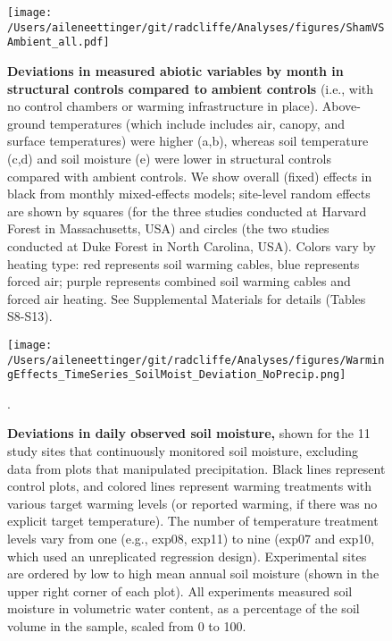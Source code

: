 \documentclass{article}
\begin{document}
 \begin{figure}[p]
\centering
\texttt{[image: /Users/aileneettinger/git/radcliffe/Analyses/figures/ShamVSAmbient\_all.pdf]} 
 \caption{\textbf{Deviations in measured abiotic variables by month in structural controls compared to ambient controls} (i.e., with no control chambers or warming infrastructure in place). Above-ground temperatures (which include includes air, canopy, and surface temperatures) were higher (a,b), whereas soil temperature (c,d) and soil moisture (e) were lower in structural controls compared with ambient controls. We show overall (fixed) effects in black from monthly mixed-effects models; site-level random effects are shown by squares (for the three studies conducted at Harvard Forest in Massachusetts, USA) and circles (the two studies conducted at Duke Forest in North Carolina, USA). Colors vary by heating type: red represents soil warming cables, blue represents forced air; purple represents combined soil warming cables and forced air heating. See Supplemental Materials for details (Tables S8-S13). }
 \label{fig:shamamb}
 \end{figure}
\clearpage
 \begin{figure}[h]
 \centering
 \texttt{[image: /Users/aileneettinger/git/radcliffe/Analyses/figures/WarmingEffects\_TimeSeries\_SoilMoist\_Deviation\_NoPrecip.png]} 
 \caption{\textbf{Deviations in daily observed soil moisture,} shown for the 11 study sites that continuously monitored soil moisture, excluding data from plots that manipulated precipitation. Black lines represent control plots, and colored lines represent warming treatments with various target warming levels (or reported warming, if there was no explicit target temperature). The number of temperature treatment levels vary from one (e.g., exp08, exp11) to nine (exp07 and exp10, which used an unreplicated regression design). Experimental sites are ordered by low to high mean annual soil moisture (shown in the upper right corner of each plot). All experiments measured soil moisture in volumetric water content, as a percentage of the soil volume in the sample, scaled from 0 to 100.}. 
 \label{fig:mois}
 \end{figure}
 
\end{document}

